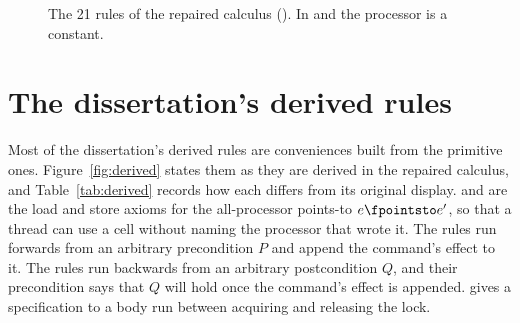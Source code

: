 \begin{figure}[!htp]
\caption{The 21 rules of the repaired calculus ().
In  and  the processor is a constant.}
\label{fig:full}
\end{figure}

\section{The dissertation's derived rules}
\label{app:derived}

Most of the dissertation's derived rules are conveniences built from the
primitive ones. Figure~\ref{fig:derived} states them as they are derived in the
repaired calculus, and Table~\ref{tab:derived} records how each differs
from its original display.  and  are the load and
store axioms for the all-processor points-to $e \fpointsto e'$, so that a
thread can use a cell without naming the processor that wrote it. The
 rules run forwards from an arbitrary precondition $P$ and append
the command's effect to it. The  rules run backwards from an
arbitrary postcondition $Q$, and their precondition says that $Q$ will hold
once the command's effect is appended.  gives a specification to
a body run between acquiring and releasing the lock.

